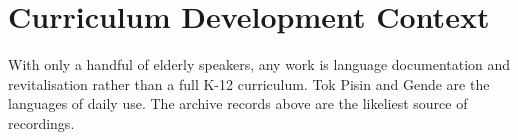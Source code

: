 \documentclass[12pt]{article}
\begin{document}
\section{Curriculum Development Context}
With only a handful of elderly speakers, any work is language documentation and revitalisation rather than a full K-12 curriculum. Tok Pisin and Gende are the languages of daily use. The archive records above are the likeliest source of recordings.
\end{document}
